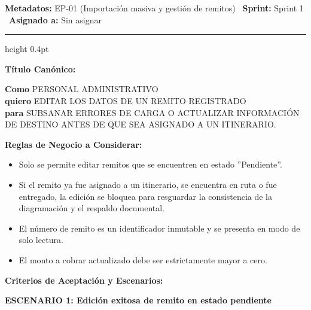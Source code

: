 \documentclass[a4paper,9pt]{article}
\begin{document}
\begin{tcolorbox}[hucard, title={\textbf{HU-41: EDITAR REMITO} \hfill \scriptsize \colorbox{tealstatus}{\textbf{\ Accepted\ }} \quad \colorbox{white}{\textcolor{primarydark}{\textbf{\ 3 pts\ }}}}]
\vspace{-1pt}
\noindent\textbf{\footnotesize Metadatos:} EP-01 (Importación masiva y gestión de remitos) \textbar\ \textbf{Sprint:} Sprint 1 \textbar\ \textbf{Asignado a:} Sin asignar\par\vspace{2pt}
\hrule height 0.4pt\par\vspace{3pt}
\noindent\textbf{\footnotesize Título Canónico:}\par\vspace{1pt}
{\small \textbf{Como} PERSONAL ADMINISTRATIVO \\ \textbf{quiero} EDITAR LOS DATOS DE UN REMITO REGISTRADO \\ \textbf{para} SUBSANAR ERRORES DE CARGA O ACTUALIZAR INFORMACIÓN DE DESTINO ANTES DE QUE SEA ASIGNADO A UN ITINERARIO.}\par\vspace{3pt}
\noindent\textbf{\footnotesize Reglas de Negocio a Considerar:}\par\vspace{1pt}
{\footnotesize
\begin{itemize}[leftmargin=12pt, nosep, itemsep=1.5pt, topsep=1pt]
\item Solo se permite editar remitos que se encuentren en estado ''Pendiente''.
\item Si el remito ya fue asignado a un itinerario, se encuentra en ruta o fue entregado, la edición se bloquea para resguardar la consistencia de la diagramación y el respaldo documental.
\item El número de remito es un identificador inmutable y se presenta en modo de solo lectura.
\item El monto a cobrar actualizado debe ser estrictamente mayor a cero.
\end{itemize}
}\par\vspace{3pt}
\noindent\textbf{\footnotesize Criterios de Aceptación y Escenarios:}\par\vspace{2pt}
{\footnotesize
\noindent\textbf{\textcolor{secondarydark}{ESCENARIO 1:  Edición exitosa de remito en estado pendiente}}\par\vspace{1pt}
}
\end{tcolorbox}
\end{document}
